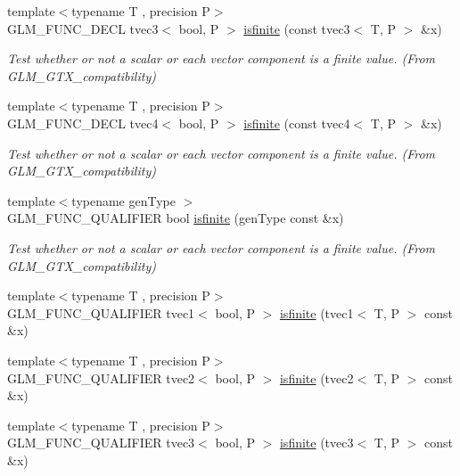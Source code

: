 \begin{DoxyCompactItemize}
{\footnotesize template$<$typename T , precision P$>$ }\\G\+L\+M\+\_\+\+F\+U\+N\+C\+\_\+\+D\+E\+C\+L tvec3$<$ bool, P $>$ \hyperlink{group__gtx__compatibility_ga1be9593d810fceb278a2854da8a25273}{isfinite} (const tvec3$<$ T, P $>$ \&x)
\begin{DoxyCompactList}\small\item\em Test whether or not a scalar or each vector component is a finite value. (From G\+L\+M\+\_\+\+G\+T\+X\+\_\+compatibility) \end{DoxyCompactList}\item 
{\footnotesize template$<$typename T , precision P$>$ }\\G\+L\+M\+\_\+\+F\+U\+N\+C\+\_\+\+D\+E\+C\+L tvec4$<$ bool, P $>$ \hyperlink{group__gtx__compatibility_ga8c6a59e2f2ac84fba0c5932f1c35bf7a}{isfinite} (const tvec4$<$ T, P $>$ \&x)
\begin{DoxyCompactList}\small\item\em Test whether or not a scalar or each vector component is a finite value. (From G\+L\+M\+\_\+\+G\+T\+X\+\_\+compatibility) \end{DoxyCompactList}\item 
{\footnotesize template$<$typename gen\+Type $>$ }\\G\+L\+M\+\_\+\+F\+U\+N\+C\+\_\+\+Q\+U\+A\+L\+I\+F\+I\+E\+R bool \hyperlink{group__gtx__compatibility_gaf4b04dcd3526996d68c1bfe17bfc8657}{isfinite} (gen\+Type const \&x)
\begin{DoxyCompactList}\small\item\em Test whether or not a scalar or each vector component is a finite value. (From G\+L\+M\+\_\+\+G\+T\+X\+\_\+compatibility) \end{DoxyCompactList}\item 
{\footnotesize template$<$typename T , precision P$>$ }\\G\+L\+M\+\_\+\+F\+U\+N\+C\+\_\+\+Q\+U\+A\+L\+I\+F\+I\+E\+R tvec1$<$ bool, P $>$ \hyperlink{namespaceglm_a4a0c6e1143567eaa44c69cb581264d3d}{isfinite} (tvec1$<$ T, P $>$ const \&x)
\item 
{\footnotesize template$<$typename T , precision P$>$ }\\G\+L\+M\+\_\+\+F\+U\+N\+C\+\_\+\+Q\+U\+A\+L\+I\+F\+I\+E\+R tvec2$<$ bool, P $>$ \hyperlink{namespaceglm_af9f90297d8c46e0f0b2fc7613a43b9bc}{isfinite} (tvec2$<$ T, P $>$ const \&x)
\item 
{\footnotesize template$<$typename T , precision P$>$ }\\G\+L\+M\+\_\+\+F\+U\+N\+C\+\_\+\+Q\+U\+A\+L\+I\+F\+I\+E\+R tvec3$<$ bool, P $>$ \hyperlink{namespaceglm_a8bfb8f7e944bcf76f13f3bd5b64f9a9c}{isfinite} (tvec3$<$ T, P $>$ const \&x)

\end{DoxyCompactItemize}
